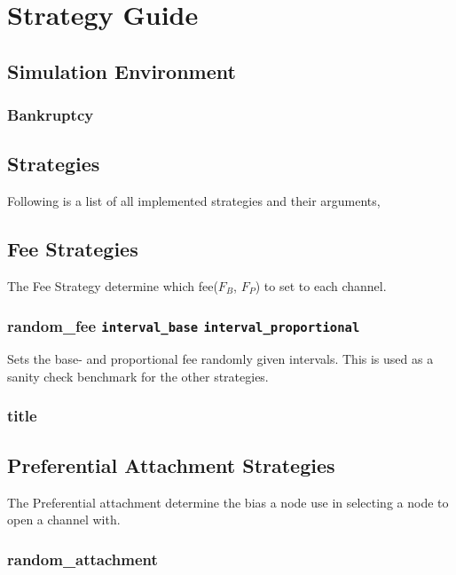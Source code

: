 \chapter{Strategy Guide}
\label{chapter:strategies}



\section{Simulation Environment}

\subsection*{Bankruptcy} 


\section{Strategies}

Following is a list of all implemented strategies and their arguments, 

\section*{Fee Strategies}

The Fee Strategy determine which fee($F_B$, $F_P$) to set to each channel.

\subsection*{random\_fee \texttt{interval\_base} \texttt{interval\_proportional}}

Sets the base- and proportional fee randomly given intervals. This is used as a sanity check benchmark for the other strategies.

\subsection*{title}

\section*{Preferential Attachment Strategies}

The Preferential attachment determine the bias a node use in selecting a node to open a channel with.

\subsection*{random\_attachment}

